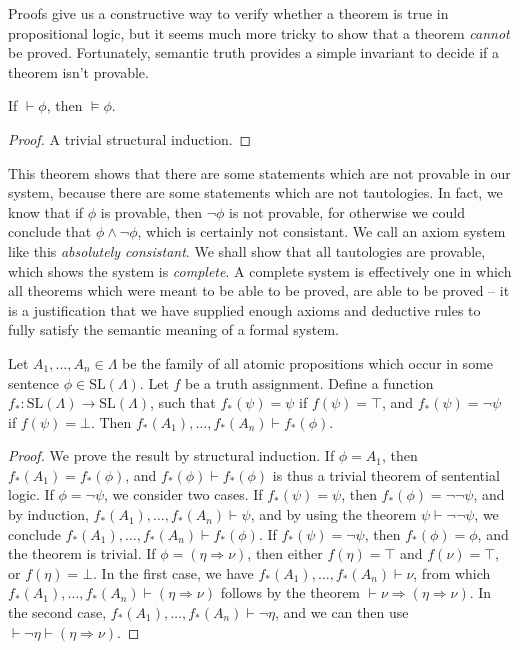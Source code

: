 Proofs give us a constructive way to verify whether a theorem is true in propositional logic, but it seems much more tricky to show that a theorem {\it cannot} be proved. Fortunately, semantic truth provides a simple invariant to decide if a theorem isn't provable.

\begin{theorem}
    If $\vdash \phi$, then $\vDash \phi$.
\end{theorem}
\begin{proof}
    A trivial structural induction.
\end{proof}

This theorem shows that there are some statements which are not provable in our system, because there are some statements which are not tautologies. In fact, we know that if $\phi$ is provable, then $\neg \phi$ is not provable, for otherwise we could conclude that $\phi \wedge \neg \phi$, which is certainly not consistant. We call an axiom system like this \emph{absolutely consistant}. We shall show that all tautologies are provable, which shows the system is \emph{complete}. A complete system is effectively one in which all theorems which were meant to be able to be proved, are able to be proved -- it is a justification that we have supplied enough axioms and deductive rules to fully satisfy the semantic meaning of a formal system.

\begin{lemma}
    Let $A_1, \dots, A_n \in \Lambda$ be the family of all atomic propositions which occur in some sentence  $\phi \in \text{SL}(\Lambda)$. Let $f$ be a truth assignment. Define a function $f_*: \text{SL}(\Lambda) \to \text{SL}(\Lambda)$, such that $f_*(\psi) = \psi$ if $f(\psi) = \top$, and $f_*(\psi) = \neg \psi$ if $f(\psi) = \bot$. Then $f_*(A_1), \dots, f_*(A_n) \vdash f_*(\phi)$.
\end{lemma}
\begin{proof}
    We prove the result by structural induction. If $\phi = A_1$, then $f_*(A_1) = f_*(\phi)$, and $f_*(\phi) \vdash f_*(\phi)$ is thus a trivial theorem of sentential logic. If $\phi = \neg \psi$, we consider two cases. If $f_*(\psi) = \psi$, then $f_*(\phi) = \neg \neg \psi$, and by induction, $f_*(A_1), \dots, f_*(A_n) \vdash \psi$, and by using the theorem $\psi \vdash \neg \neg \psi$, we conclude $f_*(A_1), \dots, f_*(A_n) \vdash f_*(\phi)$. If $f_*(\psi) = \neg \psi$, then $f_*(\phi) = \phi$, and the theorem is trivial. If $\phi = (\eta \Rightarrow \nu)$, then either $f(\eta) = \top$ and $f(\nu) = \top$, or $f(\eta) = \bot$. In the first case, we have $f_*(A_1), \dots, f_*(A_n) \vdash \nu$, from which $f_*(A_1), \dots, f_*(A_n) \vdash (\eta \Rightarrow \nu)$ follows by the theorem $\vdash \nu \Rightarrow (\eta \Rightarrow \nu)$. In the second case, $f_*(A_1), \dots, f_*(A_n) \vdash \neg \eta$, and we can then use $\vdash \neg \eta \vdash (\eta \Rightarrow \nu)$.
\end{proof}

